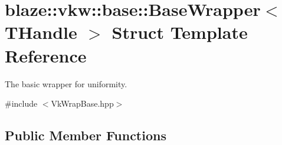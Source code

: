 \hypertarget{structblaze_1_1vkw_1_1base_1_1BaseWrapper}{}\section{blaze\+:\+:vkw\+:\+:base\+:\+:Base\+Wrapper$<$ T\+Handle $>$ Struct Template Reference}
\label{structblaze_1_1vkw_1_1base_1_1BaseWrapper}


The basic wrapper for uniformity.  




{\ttfamily \#include $<$Vk\+Wrap\+Base.\+hpp$>$}

\subsection*{Public Member Functions}
